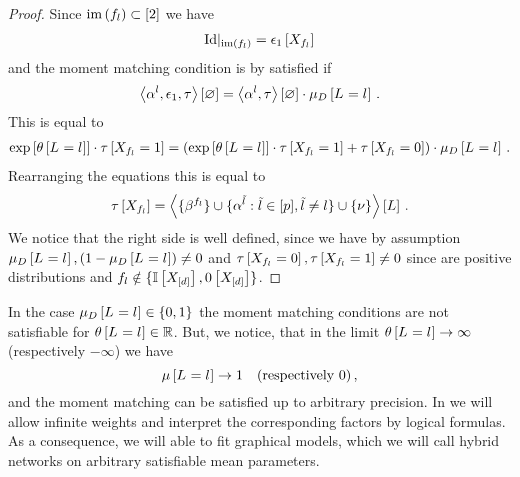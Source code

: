 \begin{proof}
    Since $\mathrm{im}\left(f_{l}\right)\subset[2]$ we have
    \begin{align*}
        {\mathrm{Id}}|_{\mathrm{im}\left(f_{l}\right)} = \epsilon_{1}\left[X_{f_{l}}\right]
    \end{align*}
    and the moment matching condition is by  satisfied if
    \begin{align*}
        \left\langle \alpha^{l}, \epsilon_{1}, \tau\right\rangle \left[ \varnothing \right]
        = \left\langle \alpha^{l},\tau\right\rangle \left[ \varnothing \right] \cdot \mu_{D}\left[L_{}=l_{}\right] \, .
    \end{align*}
    This is equal to
    \begin{align*}
        \mathrm{exp}\left[\theta\left[L_{}=l_{}\right]\right] \cdot \tau\left[X_{f_{l}}=1\right]
        = \left( \mathrm{exp}\left[\theta\left[L_{}=l_{}\right]\right] \cdot \tau\left[X_{f_{l}}=1\right] + \tau\left[X_{f_{l}}=0\right] \right) \cdot \mu_{D}\left[L_{}=l_{}\right] \, .
    \end{align*}
    Rearranging the equations this is equal to
    \begin{align*}
        \tau\left[X_{f_{l}}\right]
        = \left\langle \{\beta^{f_{l}}\}
        \cup\{\alpha^{\tilde{l}} : \tilde{l} \in [p], \tilde{l}\neq l\}
        \cup\{\nu\}\right\rangle \left[ L \right] \, .
    \end{align*}
    We notice that the right side is well defined, since we have by assumption $\mu_{D}\left[L_{}=l_{}\right], (1- \mu_{D}\left[L_{}=l_{}\right]) \neq 0$ and $\tau\left[X_{f_{l}}=0\right], \tau\left[X_{f_{l}}=1\right] \neq 0$ since \MarkovLogicNetworks{} are positive distributions and $f_{l} \notin \{\mathbb{I}\left[X_{[d]}\right],0\left[X_{[d]}\right]\}$.
\end{proof}


In the case $\mu_{D}\left[L_{}=l_{}\right]\in\{0,1\}$ the moment matching conditions are not satisfiable for $\theta\left[L_{}=l_{}\right]\in\mathbb{R}$.
But, we notice, that in the limit $\theta\left[L_{}=l_{}\right]\rightarrow \infty $ (respectively $-\infty$) we have
\[ \mu\left[L_{}=l_{}\right] \rightarrow  1 \quad \text{(respectively $0$)}\, ,  \]
and the moment matching can be satisfied up to arbitrary precision.
In  we will allow infinite weights and interpret the corresponding factors by logical formulas.
As a consequence, we will able to fit graphical models, which we will call hybrid networks on arbitrary satisfiable mean parameters.

